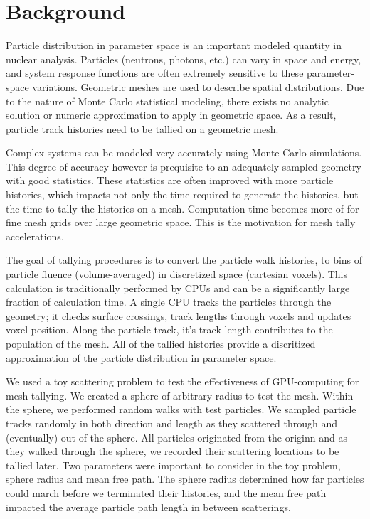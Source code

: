 
\section{Background}
Particle distribution in parameter space is an important modeled quantity in
nuclear analysis. Particles (neutrons, photons, etc.) can vary in space and
energy, and system response functions are often extremely sensitive to these
parameter-space variations. Geometric meshes are used to describe spatial
distributions. Due to the nature of Monte Carlo statistical modeling, there
exists no analytic solution or numeric approximation to apply in geometric
space. As a result, particle track histories need to be tallied on a geometric
mesh.

Complex systems can be modeled very accurately using Monte Carlo simulations.
This degree of accuracy however is prequisite to an adequately-sampled geometry
with good statistics. These statistics are often improved with more particle
histories, which impacts not only the time required to generate the histories,
but the time to tally the histories on a mesh. Computation time becomes more of
for fine mesh grids over large geometric space. This is the motivation for mesh
tally accelerations.

The goal of tallying procedures is to convert the particle walk histories,
to bins of particle fluence (volume-averaged) in discretized space (cartesian
voxels). This calculation is traditionally performed by CPUs and can be a
significantly large fraction of calculation time.
A single CPU tracks the particles through the
geometry; it checks surface crossings, track lengths through voxels and updates
voxel position. Along the particle track, it's track length contributes to the
population of the mesh. All of the tallied histories provide a discritized
approximation of the particle distribution in parameter space.

We used a toy scattering problem to test the effectiveness of GPU-computing for
mesh tallying. We created a sphere of arbitrary radius to test the mesh. Within
the sphere, we performed random walks with test particles. We sampled particle
tracks randomly in both direction and length as they scattered through and
(eventually) out of the sphere. All particles originated from the originn and
as they  walked through
the sphere, we recorded their scattering locations to be tallied later. Two
parameters were important to consider in the toy problem, sphere radius and mean
free path. The sphere radius determined how far particles could march before we
terminated their histories, and the mean free path impacted the average particle
path length in between scatterings.

